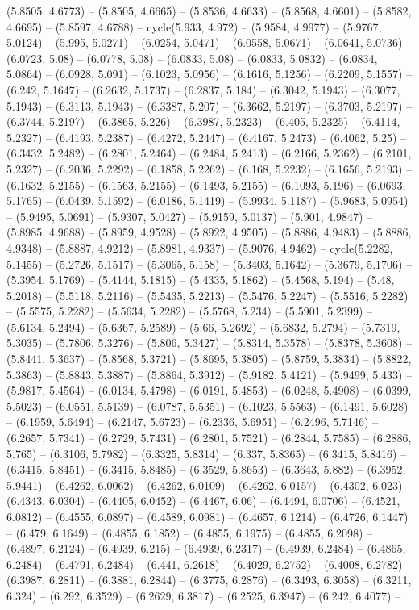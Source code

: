 (5.8505, 4.6773) -- (5.8505, 4.6665) -- (5.8536, 4.6633) -- (5.8568, 4.6601) -- (5.8582, 4.6695) -- (5.8597, 4.6788) -- cycle(5.933, 4.972) -- (5.9584, 4.9977) -- (5.9767, 5.0124) -- (5.995, 5.0271) -- (6.0254, 5.0471) -- (6.0558, 5.0671) -- (6.0641, 5.0736) -- (6.0723, 5.08) -- (6.0778, 5.08) -- (6.0833, 5.08) -- (6.0833, 5.0832) -- (6.0834, 5.0864) -- (6.0928, 5.091) -- (6.1023, 5.0956) -- (6.1616, 5.1256) -- (6.2209, 5.1557) -- (6.242, 5.1647) -- (6.2632, 5.1737) -- (6.2837, 5.184) -- (6.3042, 5.1943) -- (6.3077, 5.1943) -- (6.3113, 5.1943) -- (6.3387, 5.207) -- (6.3662, 5.2197) -- (6.3703, 5.2197) -- (6.3744, 5.2197) -- (6.3865, 5.226) -- (6.3987, 5.2323) -- (6.405, 5.2325) -- (6.4114, 5.2327) -- (6.4193, 5.2387) -- (6.4272, 5.2447) -- (6.4167, 5.2473) -- (6.4062, 5.25) -- (6.3432, 5.2482) -- (6.2801, 5.2464) -- (6.2484, 5.2413) -- (6.2166, 5.2362) -- (6.2101, 5.2327) -- (6.2036, 5.2292) -- (6.1858, 5.2262) -- (6.168, 5.2232) -- (6.1656, 5.2193) -- (6.1632, 5.2155) -- (6.1563, 5.2155) -- (6.1493, 5.2155) -- (6.1093, 5.196) -- (6.0693, 5.1765) -- (6.0439, 5.1592) -- (6.0186, 5.1419) -- (5.9934, 5.1187) -- (5.9683, 5.0954) -- (5.9495, 5.0691) -- (5.9307, 5.0427) -- (5.9159, 5.0137) -- (5.901, 4.9847) -- (5.8985, 4.9688) -- (5.8959, 4.9528) -- (5.8922, 4.9505) -- (5.8886, 4.9483) -- (5.8886, 4.9348) -- (5.8887, 4.9212) -- (5.8981, 4.9337) -- (5.9076, 4.9462) -- cycle(5.2282, 5.1455) -- (5.2726, 5.1517) -- (5.3065, 5.158) -- (5.3403, 5.1642) -- (5.3679, 5.1706) -- (5.3954, 5.1769) -- (5.4144, 5.1815) -- (5.4335, 5.1862) -- (5.4568, 5.194) -- (5.48, 5.2018) -- (5.5118, 5.2116) -- (5.5435, 5.2213) -- (5.5476, 5.2247) -- (5.5516, 5.2282) -- (5.5575, 5.2282) -- (5.5634, 5.2282) -- (5.5768, 5.234) -- (5.5901, 5.2399) -- (5.6134, 5.2494) -- (5.6367, 5.2589) -- (5.66, 5.2692) -- (5.6832, 5.2794) -- (5.7319, 5.3035) -- (5.7806, 5.3276) -- (5.806, 5.3427) -- (5.8314, 5.3578) -- (5.8378, 5.3608) -- (5.8441, 5.3637) -- (5.8568, 5.3721) -- (5.8695, 5.3805) -- (5.8759, 5.3834) -- (5.8822, 5.3863) -- (5.8843, 5.3887) -- (5.8864, 5.3912) -- (5.9182, 5.4121) -- (5.9499, 5.433) -- (5.9817, 5.4564) -- (6.0134, 5.4798) -- (6.0191, 5.4853) -- (6.0248, 5.4908) -- (6.0399, 5.5023) -- (6.0551, 5.5139) -- (6.0787, 5.5351) -- (6.1023, 5.5563) -- (6.1491, 5.6028) -- (6.1959, 5.6494) -- (6.2147, 5.6723) -- (6.2336, 5.6951) -- (6.2496, 5.7146) -- (6.2657, 5.7341) -- (6.2729, 5.7431) -- (6.2801, 5.7521) -- (6.2844, 5.7585) -- (6.2886, 5.765) -- (6.3106, 5.7982) -- (6.3325, 5.8314) -- (6.337, 5.8365) -- (6.3415, 5.8416) -- (6.3415, 5.8451) -- (6.3415, 5.8485) -- (6.3529, 5.8653) -- (6.3643, 5.882) -- (6.3952, 5.9441) -- (6.4262, 6.0062) -- (6.4262, 6.0109) -- (6.4262, 6.0157) -- (6.4302, 6.023) -- (6.4343, 6.0304) -- (6.4405, 6.0452) -- (6.4467, 6.06) -- (6.4494, 6.0706) -- (6.4521, 6.0812) -- (6.4555, 6.0897) -- (6.4589, 6.0981) -- (6.4657, 6.1214) -- (6.4726, 6.1447) -- (6.479, 6.1649) -- (6.4855, 6.1852) -- (6.4855, 6.1975) -- (6.4855, 6.2098) -- (6.4897, 6.2124) -- (6.4939, 6.215) -- (6.4939, 6.2317) -- (6.4939, 6.2484) -- (6.4865, 6.2484) -- (6.4791, 6.2484) -- (6.441, 6.2618) -- (6.4029, 6.2752) -- (6.4008, 6.2782) -- (6.3987, 6.2811) -- (6.3881, 6.2844) -- (6.3775, 6.2876) -- (6.3493, 6.3058) -- (6.3211, 6.324) -- (6.292, 6.3529) -- (6.2629, 6.3817) -- (6.2525, 6.3947) -- (6.242, 6.4077) -- 
